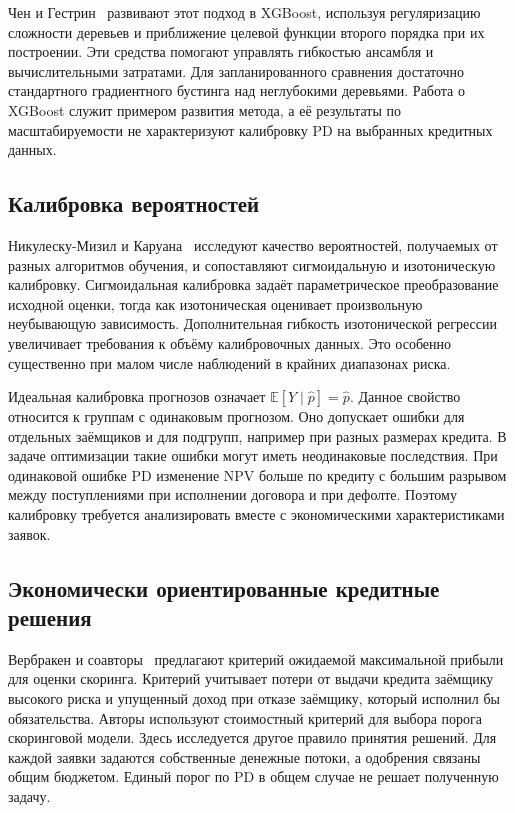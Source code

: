 \documentclass{misisarticle}
\begin{document}
Чен и Гестрин~\cite{xgboost} развивают этот подход в XGBoost, используя регуляризацию сложности деревьев и приближение целевой функции второго порядка при их построении. Эти средства помогают управлять гибкостью ансамбля и вычислительными затратами. Для запланированного сравнения достаточно стандартного градиентного бустинга над неглубокими деревьями. Работа о XGBoost служит примером развития метода, а её результаты по масштабируемости не характеризуют калибровку PD на выбранных кредитных данных.

\subsection{Калибровка вероятностей}

Никулеску-Мизил и Каруана~\cite{niculescu} исследуют качество вероятностей, получаемых от разных алгоритмов обучения, и сопоставляют сигмоидальную и изотоническую калибровку. Сигмоидальная калибровка задаёт параметрическое преобразование исходной оценки, тогда как изотоническая оценивает произвольную неубывающую зависимость. Дополнительная гибкость изотонической регрессии увеличивает требования к объёму калибровочных данных. Это особенно существенно при малом числе наблюдений в крайних диапазонах риска.

Идеальная калибровка прогнозов означает $\mathbb{E}[Y\mid\hat p]=\hat p$. Данное свойство относится к группам с одинаковым прогнозом. Оно допускает ошибки для отдельных заёмщиков и для подгрупп, например при разных размерах кредита. В задаче оптимизации такие ошибки могут иметь неодинаковые последствия. При одинаковой ошибке PD изменение NPV больше по кредиту с большим разрывом между поступлениями при исполнении договора и при дефолте. Поэтому калибровку требуется анализировать вместе с экономическими характеристиками заявок.

\subsection{Экономически ориентированные кредитные решения}

Вербракен и соавторы~\cite{verbraken} предлагают критерий ожидаемой максимальной прибыли для оценки скоринга. Критерий учитывает потери от выдачи кредита заёмщику высокого риска и упущенный доход при отказе заёмщику, который исполнил бы обязательства. Авторы используют стоимостный критерий для выбора порога скоринговой модели. Здесь исследуется другое правило принятия решений. Для каждой заявки задаются собственные денежные потоки, а одобрения связаны общим бюджетом. Единый порог по PD в общем случае не решает полученную задачу.
\end{document}
